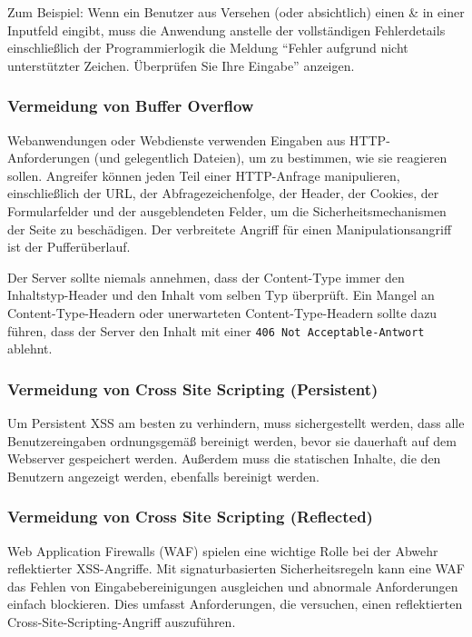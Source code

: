 Zum Beispiel: Wenn ein Benutzer aus Versehen (oder absichtlich) einen \& in einer Inputfeld eingibt, muss die Anwendung anstelle der vollständigen Fehlerdetails einschließlich der Programmierlogik die Meldung "`Fehler aufgrund nicht unterstützter Zeichen. Überprüfen Sie Ihre Eingabe"' anzeigen\cite{ase17}.

\subsubsection{Vermeidung von Buffer Overflow}

Webanwendungen oder Webdienste verwenden Eingaben aus HTTP-Anforderungen (und gelegentlich Dateien), um zu bestimmen, wie sie reagieren sollen. Angreifer können jeden Teil einer HTTP-Anfrage manipulieren, einschließlich der URL, der Abfragezeichenfolge, der Header, der Cookies, der Formularfelder und der ausgeblendeten Felder, um die Sicherheitsmechanismen der Seite zu beschädigen. Der verbreitete Angriff für einen Manipulationsangriff ist der Pufferüberlauf.

Der Server sollte niemals annehmen, dass der Content-Type immer den Inhaltstyp-Header und den Inhalt vom selben Typ überprüft. Ein Mangel an Content-Type-Headern oder unerwarteten Content-Type-Headern sollte dazu führen, dass der Server den Inhalt mit einer \texttt{406 Not Acceptable-Antwort} ablehnt\cite{bofangpre16}.

\subsubsection{Vermeidung von Cross Site Scripting (Persistent)}

Um Persistent XSS am besten zu verhindern, muss sichergestellt werden, dass alle Benutzereingaben ordnungsgemäß bereinigt werden, bevor sie dauerhaft auf dem Webserver gespeichert werden. Außerdem muss die statischen Inhalte, die den Benutzern angezeigt werden, ebenfalls bereinigt werden\cite{xsspersistent14}.

\subsubsection{Vermeidung von Cross Site Scripting (Reflected)}

Web Application Firewalls (WAF) spielen eine wichtige Rolle bei der Abwehr reflektierter XSS-Angriffe. Mit signaturbasierten Sicherheitsregeln kann eine WAF das Fehlen von Eingabebereinigungen ausgleichen und abnormale Anforderungen einfach blockieren. Dies umfasst Anforderungen, die versuchen, einen reflektierten Cross-Site-Scripting-Angriff auszuführen\cite{xssreflected16}.

